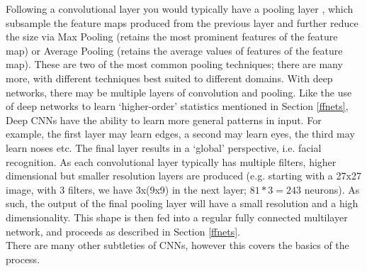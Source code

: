 \documentclass[12pt]{article}
\begin{document}
Following a convolutional layer you would typically have a pooling layer \autocite{haykin2010neural}, which subsample the feature maps produced from the previous layer and further reduce the size via Max Pooling \autocite{riesenhuber1999hierarchical} (retains the most prominent features of the feature map) or Average Pooling (retains the average values of features of the feature map). These are two of the most common pooling techniques; there are many more, with different techniques best suited to different domains. With deep networks, there may be multiple layers of convolution and pooling. Like the use of deep networks to learn `higher-order' statistics mentioned in Section \ref{ffnets}, Deep CNNs have the ability to learn more general patterns in input. For example, the first layer may learn edges, a second may learn eyes, the third may learn noses etc. The final layer results in a `global' perspective, i.e. facial recognition. As each convolutional layer typically has multiple filters, higher dimensional but smaller resolution layers are produced (e.g. starting with a 27x27 image, with 3 filters, we have 3x(9x9) in the next layer; $81*3 = 243$ neurons). As such, the output of the final pooling layer will have a small resolution and a high dimensionality. This shape is then fed into a regular fully connected multilayer network, and proceeds as described in Section \ref{ffnets}. \\\newline
There are many other subtleties of CNNs, however this covers the basics of the process.
\end{document}
